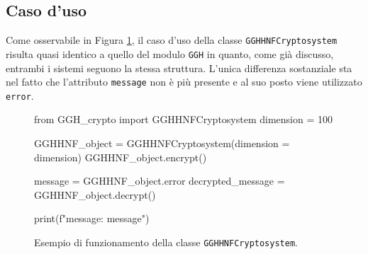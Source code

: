 \subsection{Caso d'uso}

Come osservabile in Figura \ref{fig:gghhnfmoduleexample}, il caso d'uso della classe 
\texttt{GGHHNFCryptosystem} risulta quasi identico a quello del
modulo \texttt{GGH} in quanto, come già discusso, entrambi i sistemi seguono la stessa struttura.  
L'unica differenza sostanziale sta nel fatto che l'attributo \texttt{message} non è più 
presente e al suo posto viene utilizzato \texttt{error}. 

\begin{figure}[h]
    \begin{python}
        from GGH_crypto import GGHHNFCryptosystem
        dimension = 100

        GGHHNF_object = GGHHNFCryptosystem(dimension = dimension)
        GGHHNF_object.encrypt()

        message = GGHHNF_object.error
        decrypted_message = GGHHNF_object.decrypt()

        print(f"message: {message}")
    \end{python}
    \caption{Esempio di funzionamento della classe \texttt{GGHHNFCryptosystem}.}
    \label{fig:gghhnfmoduleexample}
\end{figure}